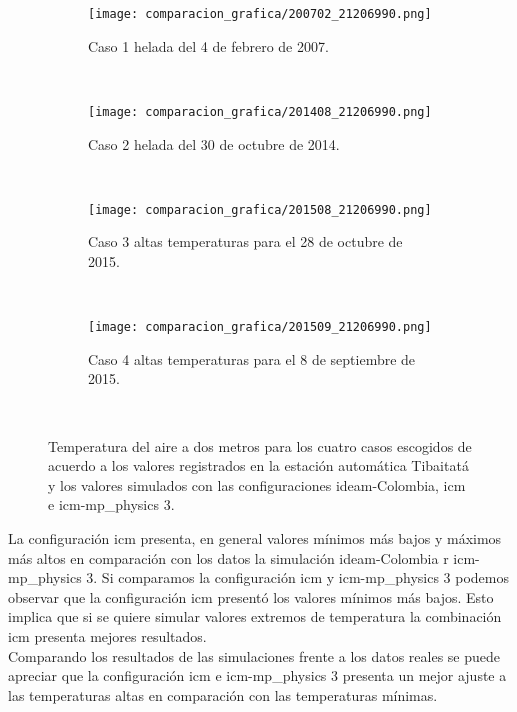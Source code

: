 \begin{figure}[H]
    
\begin{subfigure}[normla]{0.4\textwidth}
\caption{Caso 1 helada del 4 de febrero de 2007.}
\label{caso1_tiba_wrf}
\texttt{[image: comparacion\_grafica/200702\_21206990.png]}
\end{subfigure}
~
\begin{subfigure}[normla]{0.4\textwidth}
\caption{Caso 2 helada del 30 de octubre de 2014.}
\label{caso2_tiba_wrf}
\texttt{[image: comparacion\_grafica/201408\_21206990.png]}
\end{subfigure}
~
\centering
\begin{subfigure}[normla]{0.4\textwidth}
\caption{Caso 3 altas temperaturas para el 28 de octubre de 2015.}
\label{caso3_tiba_wrf}
\texttt{[image: comparacion\_grafica/201508\_21206990.png]}
\end{subfigure}
~
\centering
\begin{subfigure}[normla]{0.4\textwidth}
\caption{Caso 4 altas temperaturas para el 8 de septiembre de 2015.}
\label{caso4_tiba_wrf}
\texttt{[image: comparacion\_grafica/201509\_21206990.png]}
\end{subfigure}
~

    \caption{Temperatura del aire a dos metros para los cuatro casos escogidos de acuerdo a los valores registrados en la estación automática Tibaitatá y los valores simulados con las configuraciones ideam-Colombia, icm e icm-mp\_physics 3.}
    \label{fig:wrf_temp_tibaitata}

\end{figure}



La configuración icm presenta, en general valores mínimos más bajos y máximos más altos en comparación con los datos la simulación ideam-Colombia r icm-mp\_physics 3. Si comparamos la configuración icm y icm-mp\_physics 3 podemos observar que la configuración icm presentó los valores mínimos más bajos. Esto implica que si se quiere simular valores extremos de temperatura la combinación icm presenta mejores resultados.\\

Comparando los resultados de las simulaciones frente a los datos reales se puede apreciar que la configuración icm e icm-mp\_physics 3 presenta un mejor ajuste a las temperaturas altas en comparación con las temperaturas mínimas.\\


